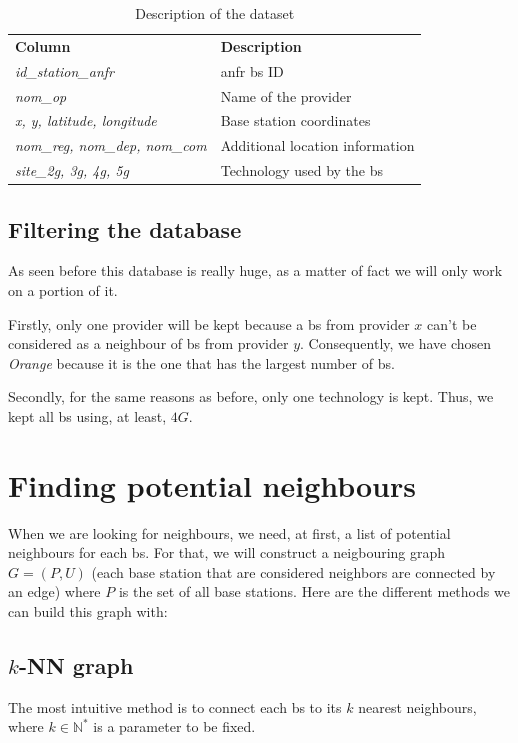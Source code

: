 \documentclass[lettersize,journal,english]{IEEEtran}
\begin{document}
\begin{table}[!b]
    \centering
    \caption{Description of the dataset}
    \label{table:data_columns}
    \begin{tabular}{ll}
        \toprule
        \textbf{Column} & \textbf{Description} \\
        \cmidrule(lr){1-2}
        \textsl{id\_station\_anfr} & \acrshort{anfr} \acrshort{bs} ID \\ 
        \textsl{nom\_op} & Name of the provider \\
        \textsl{x, y, latitude, longitude} & Base station coordinates \\ 
        \textsl{nom\_reg, nom\_dep, nom\_com} & Additional location information \\  
        \textsl{site\_2g, 3g, 4g, 5g} & Technology used by the \acrshort{bs} \\ 
        \bottomrule
    \end{tabular}
\end{table}

\subsection{Filtering the database}
As seen before this database is really huge, as a matter of fact we will only work on a portion of it.

Firstly, only one provider will be kept because a \acrshort{bs} from provider $x$ can't be considered as a neighbour of \acrshort{bs} from provider $y$.
Consequently, we have chosen \emph{Orange} because it is the one that has the largest number of \acrshort{bs}.

Secondly, for the same reasons as before, only one technology is kept. Thus, we kept all \acrshort{bs} using, at least, $4G$.

\section{Finding potential neighbours}
\noindent When we are looking for neighbours, we need, at first, a list of potential neighbours for each \acrfull{bs}.
For that, we will construct a neigbouring graph $G = (P, U)$ (each base station that are considered neighbors are
connected by an edge) where $P$ is the set of all base stations. 
Here are the different methods we can build this graph with:

\subsection{$k$-NN graph}
\noindent The most intuitive method is to connect each \acrshort{bs} to its $k$ nearest neighbours, where $k \in \mathbb{N}^*$ 
is a parameter to be fixed. 
\end{document}
